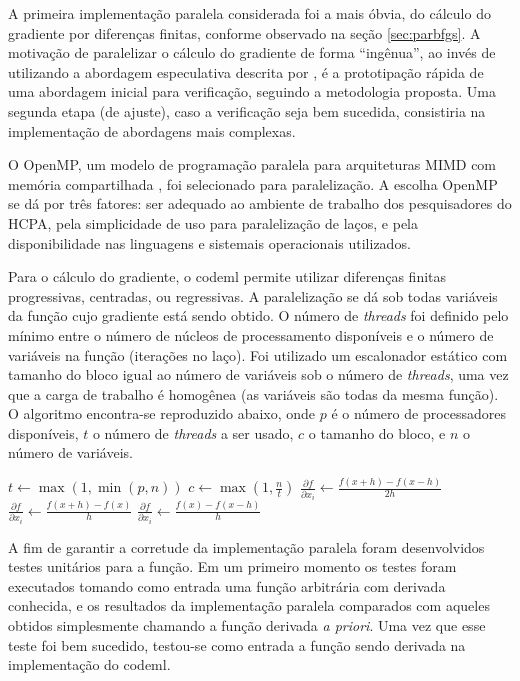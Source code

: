 \documentclass[cic,tc]{iiufrgs}
\begin{document}
A primeira implementação paralela considerada foi a mais óbvia, do cálculo do
gradiente por diferenças finitas, conforme observado na seção
\ref{sec:parbfgs}. A motivação de paralelizar o cálculo do gradiente de forma
``ingênua'', ao invés de utilizando a abordagem especulativa descrita por
\cite{byrd1988parallel}, é a prototipação rápida de uma abordagem inicial para
verificação, seguindo a metodologia proposta. Uma segunda etapa (de ajuste),
caso a verificação seja bem sucedida, consistiria na implementação de
abordagens mais complexas.

O OpenMP, um modelo de programação paralela para arquiteturas MIMD com memória
compartilhada \cite{chandra2001parallel}, foi selecionado para paralelização. A
escolha OpenMP se dá por três fatores: ser adequado ao ambiente de trabalho dos
pesquisadores do HCPA, pela simplicidade de uso para paralelização de laços, e
pela disponibilidade nas linguagens e sistemais operacionais utilizados.

Para o cálculo do gradiente, o codeml permite utilizar diferenças finitas
progressivas, centradas, ou regressivas. A paralelização se dá sob todas
variáveis da função cujo gradiente está sendo obtido. O número de
\textit{threads} foi definido pelo mínimo entre o número de núcleos de
processamento disponíveis e o número de variáveis na função (iterações no
laço). Foi utilizado um escalonador estático com tamanho do bloco igual ao
número de variáveis sob o número de \textit{threads}, uma vez que a carga de
trabalho é homogênea (as variáveis são todas da mesma função). O algoritmo
encontra-se reproduzido abaixo, onde $p$ é o número de processadores
disponíveis, $t$ o número de \textit{threads} a ser usado, $c$ o tamanho do
bloco, e $n$ o número de variáveis.

\begin{algorithmic}
\State $t \gets \max(1, \min(p, n))$
\State $c \gets \max(1, \frac{n}{t})$
    \State $\frac{\partial f}{\partial x_i} \gets \frac{f(x+h)-f(x-h)}{2h}$
    \State $\frac{\partial f}{\partial x_i} \gets \frac{f(x+h)-f(x)}{h}$
  \Else
    \State $\frac{\partial f}{\partial x_i} \gets \frac{f(x)-f(x-h)}{h}$
  \EndIf
\EndFor
\end{algorithmic}

A fim de garantir a corretude da implementação paralela foram desenvolvidos
testes unitários para a função. Em um primeiro momento os testes foram
executados tomando como entrada uma função arbitrária com derivada conhecida,
e os resultados da implementação paralela comparados com aqueles obtidos
simplesmente chamando a função derivada \textit{a priori}. Uma vez que esse
teste foi bem sucedido, testou-se como entrada a função sendo derivada na
implementação do codeml.
\end{document}
